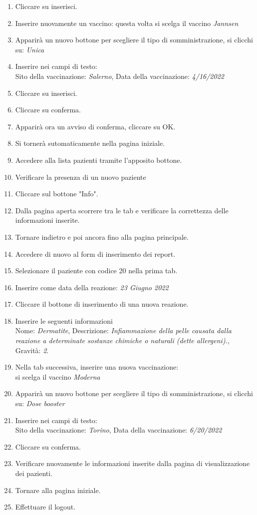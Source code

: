 \documentclass{article}
\begin{document}
\begin{enumerate}
        \item Cliccare su inserisci.
        \item Inserire nuovamente un vaccino: questa volta si scelga il vaccino \textit{Jannsen}
        \item Apparirà un nuovo bottone per scegliere il tipo di somministrazione, si clicchi su: \textit{Unica}
        \item Inserire nei campi di testo:\\
            Sito della vaccinazione: \textit{Salerno}, Data della vaccinazione: \textit{4/16/2022}
        \item Cliccare su inserisci.
        \item Cliccare su conferma.
        \item Apparirà ora un avviso di conferma, cliccare su OK.
        \item Si tornerà sutomaticamente nella pagina iniziale. 
        \item Accedere alla lista pazienti tramite l'apposito bottone.
        \item Verificare la presenza di un nuovo paziente
        \item Cliccare sul bottone "Info".
        \item Dalla pagina aperta scorrere tra le tab e verificare la correttezza delle informazioni inserite.
        \item Tornare indietro e poi ancora fino alla pagina principale.
        \item Accedere di nuovo al form di inserimento dei report.
        \item Selezionare il paziente con codice 20 nella prima tab.
        \item Inserire come data della reazione: \textit{23 Giugno 2022}
        \item Cliccare il bottone di inserimento di una nuova reazione.
        \item Inserire le seguenti informazioni\\ 
                Nome: \textit{Dermatite}, Descrizione: \textit{Infiammazione della pelle causata dalla reazione a determinate sostanze chimiche o naturali (dette allergeni).}, Gravità: \textit{2}.
        \item Nella tab successiva, inserire una nuova vaccinazione:\\
            si scelga il vaccino \textit{Moderna}
        \item Apparirà un nuovo bottone per scegliere il tipo di somministrazione, si clicchi su: \textit{Dose booster}
        \item Inserire nei campi di testo:\\
            Sito della vaccinazione: \textit{Torino}, Data della vaccinazione: \textit{6/20/2022}
        \item Cliccare su conferma.
        \item Verificare nuovamente le informazioni inserite dalla pagina di visualizzazione dei pazienti.
        \item Tornare alla pagina iniziale.
        \item Effettuare il logout.
    \end{enumerate}
\end{document}
